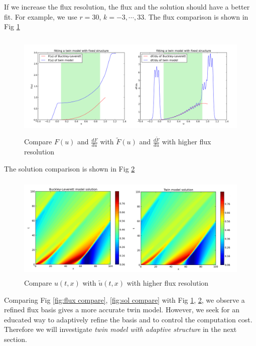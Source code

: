 \documentclass[a4paper,onecolumn]{article}
\theoremstyle{remark}
\begin{document}
\noindent If we increase the flux resolution, the flux and the solution should have a better fit.
For example, we use $r=30$, $k=-3,\cdots,33$. The flux comparison is shown in Fig
\ref{fig:flux compare 30}
\begin{figure}[H]\begin{center}
    \includegraphics[height=5cm]{fit_flux_30_1.png}
    \caption{Compare $F(u)$ and $\frac{dF}{du}$ with $\tilde{F}(u)$ and $\frac{d\tilde{F}}{du}$
             with higher flux resolution}
    \label{fig:flux compare 30}
\end{center}\end{figure}
\noindent The solution comparison is shown in Fig \ref{fig:sol compare 30}
\begin{figure}[H]\begin{center}
    \includegraphics[height=5cm]{BL_sol_30.png}
    \caption{Compare $u(t,x)$ with $\tilde{u}(t,x)$ with higher flux resolution}
    \label{fig:sol compare 30}
\end{center}\end{figure}
\noindent Comparing Fig \ref{fig:flux compare}, \ref{fig:sol compare} 
with Fig \ref{fig:flux compare 30}, \ref{fig:sol compare 30}, we observe a refined flux basis 
gives a more accurate twin model.
However, we seek for an educated way to adaptively refine the
basis and to control the computation cost.
Therefore we will investigate \emph{twin model with adaptive structure}
in the next section.
\end{document}
